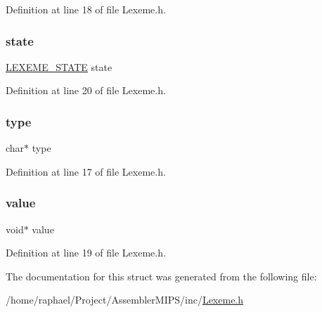 Definition at line 18 of file Lexeme.\+h.

\mbox{\label{struct_l_e_x_e_m_e_af2253914b7dd2807b30fff801d67a7b2}} 
\subsubsection{\texorpdfstring{state}{state}}
{\footnotesize\ttfamily \mbox{\hyperlink{_f_s_m_lexeme_8h_a5d966dc44e04ff2eef3b33046a1e67ad}{L\+E\+X\+E\+M\+E\+\_\+\+S\+T\+A\+TE}} state}



Definition at line 20 of file Lexeme.\+h.

\mbox{\label{struct_l_e_x_e_m_e_a23506fc4821ab6d9671f3e6222591a96}} 
\subsubsection{\texorpdfstring{type}{type}}
{\footnotesize\ttfamily char$\ast$ type}



Definition at line 17 of file Lexeme.\+h.

\mbox{\label{struct_l_e_x_e_m_e_a0f61d63b009d0880a89c843bd50d8d76}} 
\subsubsection{\texorpdfstring{value}{value}}
{\footnotesize\ttfamily void$\ast$ value}



Definition at line 19 of file Lexeme.\+h.



The documentation for this struct was generated from the following file\+:\begin{DoxyCompactItemize}
\item 
/home/raphael/\+Project/\+Assembler\+M\+I\+P\+S/inc/\mbox{\hyperlink{_lexeme_8h}{Lexeme.\+h}}\end{DoxyCompactItemize}
